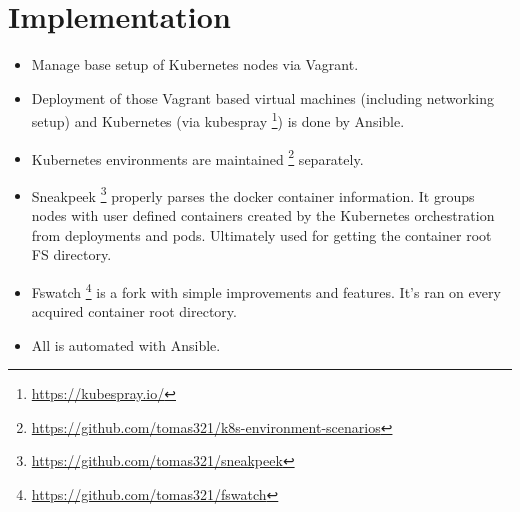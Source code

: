 \chapter{Implementation \label{implementation}}

\begin{itemize}[noitemsep]
	\item 
	Manage base setup of Kubernetes nodes via Vagrant.
	\item 
	Deployment of those Vagrant based virtual machines (including networking setup) and Kubernetes (via kubespray \footnote{\url{https://kubespray.io/}}) is done by Ansible.
	\item 
	Kubernetes environments are maintained \footnote{\url{https://github.com/tomas321/k8s-environment-scenarios}} separately.
	\item
	Sneakpeek \footnote{\url{https://github.com/tomas321/sneakpeek}} properly parses the docker container information. It groups nodes with user defined containers created by the Kubernetes orchestration from deployments and pods. Ultimately used for getting the container root FS directory.
	\item
	Fswatch \footnote{\url{https://github.com/tomas321/fswatch}} is a fork with simple improvements and features. It's ran on every acquired container root directory.
	\item
	All is automated with Ansible.	
	
\end{itemize}